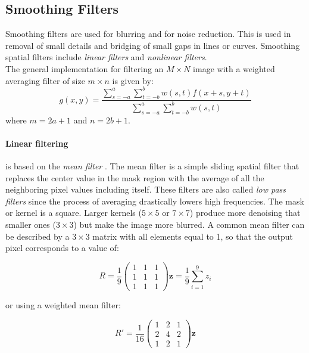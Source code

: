 \documentclass{standalone}
\begin{document}
\subsection{Smoothing Filters}
Smoothing filters are used for blurring and for noise reduction\cite{corrandconv}.
This is used in removal of small details and bridging of small gaps in lines or curves.
Smoothing spatial filters include \textit{linear filters} and \textit{nonlinear filters}\cite{corrandconv}.\\
The general implementation for filtering an $M \times N$ image with a weighted averaging filter of size $m \times n$ is given by:
\begin{equation}
    g(x, y) = \frac{\sum_{s = -a}^{a} \sum_{t = -b}^{b} w(s, t) f(x + s, y + t)}{\sum_{s = -a}^{a} \sum_{t = -b}^{b} w(s, t)}
\end{equation}
where $m=2a+1$ and $n=2b+1$.

\paragraph{Linear filtering} is based on the \textit{mean filter} \cite{filters}.
The mean filter is a simple sliding spatial filter that replaces the center value in the mask region with the average of all the neighboring pixel values including itself. 
These filters are also called \textit{low pass filters} since the process of averaging drastically lowers high frequencies.
The mask or kernel is a square.
Larger kernels ($5\times5$ or $7\times7$) produce more denoising that smaller ones ($3 \times 3$) but make the image more blurred\cite{filters}. 
A common mean filter can be described by a $3\times3$ matrix with all elements equal to 1, so that the output pixel corresponds to a value of:

\begin{equation}
    R = \frac{1}{9} \begin{pmatrix}
        1 & 1 & 1\\
        1 & 1 & 1\\
        1 & 1 & 1
        \end{pmatrix} \mathbf{z} = \frac{1}{9} \sum_{i = 1}^{9}z_i
\end{equation}

 or using a weighted mean filter:

\begin{equation}
     R' = \frac{1}{16}\begin{pmatrix}
        1 & 2 & 1\\
        2 & 4 & 2\\
        1 & 2 & 1
        \end{pmatrix} \mathbf{z}
\end{equation}
\end{document}

